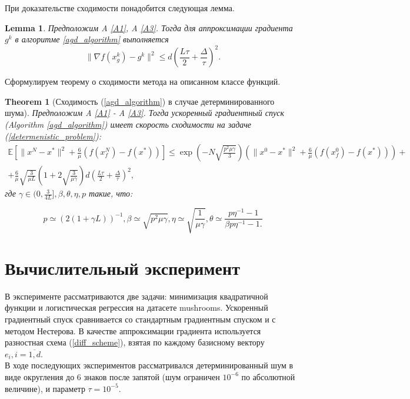 \documentclass{article}
\newtheorem{theorem}{Theorem}
\newtheorem{lemma}{Lemma}
\begin{document}
При доказательстве сходимости понадобится следующая лемма.
\begin{lemma}\label{lemma1}
 Предположим A \ref{A1}, A \ref{A3}. Тогда для аппроксимации градиента $g^k$ в алгоритме \ref{agd_algorithm} выполняется
 \begin{equation}
  \|\nabla f(x_g^k) - g^k\|^2 \leqslant d \left(\frac{L\tau}{2} + \frac{\Delta}{\tau}\right)^2.
  \label{approximation_estimate}
 \end{equation}

\end{lemma}

Сформулируем теорему о сходимости метода на описанном классе функций.

\begin{theorem}[Сходимость (\ref{agd_algorithm}) в случае детерминированного шума]\label{theorem1}
  Предположим A \ref{A1} - A \ref{A3}. Тогда ускоренный градиентный спуск (Algorithm \ref{agd_algorithm}) имеет скорость сходимости на задаче (\ref{determenistic_problem}):
  \begin{equation}
   \begin{aligned}
   \mathbb{E}\left[\|x^N - x^*\|^2 + \frac{6}{\mu} (f(x_f^N) - f(x^*))\right] \leqslant \exp\left(- N\sqrt{\frac{p^2\mu\gamma}{3}}\right) \left(\|x^0 - x^*\|^2 + \frac{6}{\mu} (f(x_f^0) - f(x^*))\right) + \\
   + \frac{6}{\mu} \sqrt{\frac{3}{\mu L}} \left(1 + 2\sqrt{\frac{3}{\mu \gamma}}\right) d \left(\frac{L\tau}{2} + \frac{\Delta}{\tau}\right)^2,
   \label{deterministic_convergence}
   \end{aligned}
  \end{equation}
  где $\gamma \in (0, \frac{3}{4L}], \beta, \theta, \eta, p$ такие, что:

  \begin{equation}
   p \simeq (2(1 + \gamma L))^{-1}, \beta \simeq \sqrt{p^2 \mu \gamma}, \eta \simeq \sqrt{\frac{1}{\mu\gamma}}, \theta \simeq \frac{p \eta^{-1} - 1}{\beta p \eta^{-1} - 1.}
  \end{equation}

\end{theorem}

\section{Вычислительный эксперимент}
В эксперименте рассматриваются две задачи: минимизация квадратичной функции и логистическая регрессия на датасете mushrooms. Ускоренный градиентный спуск сравнивается со стандартным градиентным спуском и с методом Нестерова. В качестве аппроксимации градиента используется разностная схема (\ref{diff_scheme}), взятая по каждому базисному вектору $e_i, i = \overline{1, d}$.\\
В ходе последующих экспериментов рассматривался детерминированный шум в виде округления до 6 знаков после запятой (шум ограничен $10^{-6}$ по абсолютной величине), и параметр $\tau = 10^{-5}$.
\end{document}

